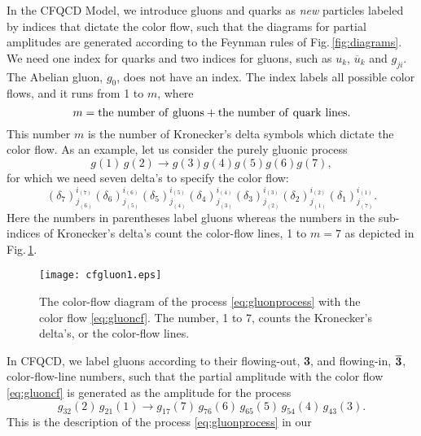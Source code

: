 \documentclass[a4paper,11pt]{article}
\begin{document}
In the CFQCD Model, we introduce gluons and quarks as {\it new}
particles labeled by indices that dictate the color flow, such that the
diagrams for partial amplitudes are generated according to the Feynman rules of
Fig.\,\ref{fig:diagrams}. We need one index for quarks and two indices for gluons, such as $u_k$,
$\overline{u}_k$ and $g_{ji}$. The Abelian gluon, $g_0$, does not
have an index.
 The index labels all possible color flows, and it
 runs from 1 to $m$, where
\begin{equation}
  m = {\rm the\,\, number\,\, of\,\, gluons} + {\rm the\,\, number\,\,
  of\,\, quark\,\, lines}.
\label{eq:m}
\end{equation}
This number $m$ is the number of Kronecker's delta symbols which dictate the color flow.
As an example, let us consider the purely gluonic process
\begin{equation}
g(1)\,g(2)\rightarrow g(3)g(4)g(5)g(6)g(7),
\label{eq:gluonprocess}
\end{equation}
for which we need seven delta's to specify the color flow:
\begin{equation}
(\delta_7)^{i_{(7)}}_{j_{(6)}}(\delta_6)^{i_{(6)}}_{j_{(5)}}
(\delta_5)^{i_{(5)}}_{j_{(4)}}(\delta_4)^{i_{(4)}}_{j_{(3)}}(\delta_3)^{i_{(3)}}_{j_{(2)}}
(\delta_2)^{i_{(2)}}_{j_{(1)}}(\delta_1)^{i_{(1)}}_{j_{(7)}}.
\label{eq:gluoncf}
\end{equation}
Here the numbers in parentheses label gluons
whereas the numbers in the sub-indices of Kronecker's delta's count the color-flow lines, 1 to $m=7$ as depicted in
 Fig.\,\ref{fig:cfgluon}.
\begin{figure}
\begin{center}
\texttt{[image: cfgluon1.eps]}
\caption{The color-flow diagram of the process \eqref{eq:gluonprocess}
 with the color flow \eqref{eq:gluoncf}. The number, 1 to 7, counts the
 Kronecker's delta's, or the color-flow lines.}
\label{fig:cfgluon}
\end{center}
\end{figure}
 In CFQCD, we label
 gluons according to their flowing-out, {\bf 3}, and flowing-in,
 $\overline{{\bf 3}}$,
 color-flow-line numbers, such that the partial amplitude
 with the color flow \eqref{eq:gluoncf} is generated as the
 amplitude for the process
\begin{equation}
g_{32}(2)\,g_{21}(1)\rightarrow
 g_{17}(7)\,g_{76}(6)\,g_{65}(5)\,g_{54}(4)\,g_{43}(3).
 \label{eq:process0}
\end{equation}
This is the description of the process \eqref{eq:gluonprocess} in our
\end{document}
